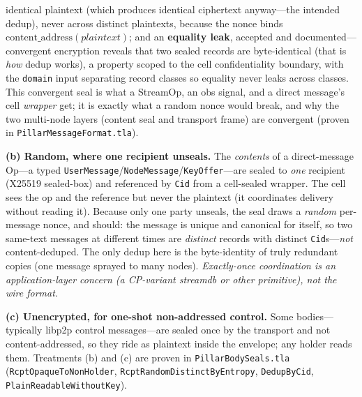 \documentclass[10pt,twocolumn]{article}
\newcommand{\code}[1]{\texttt{\small #1}}
\newcommand{\Cid}{\code{Cid}}
\begin{document}
identical plaintext (which produces identical ciphertext anyway---the intended
dedup), never across distinct plaintexts, because the nonce binds
$\mathrm{content\_address}(\mathit{plaintext})$; and an \textbf{equality leak},
accepted and documented---convergent encryption reveals that two sealed records are
byte-identical (that is \emph{how} dedup works), a property scoped to the cell
confidentiality boundary, with the \code{domain} input separating record classes
so equality never leaks across classes. This convergent seal is what a StreamOp, an
obs signal, and a direct message's cell \emph{wrapper} get; it is exactly what a
random nonce would break, and why the two multi-node layers (content seal and
transport frame) are convergent (proven in \code{PillarMessageFormat.tla}).

\textbf{(b) Random, where one recipient unseals.} The \emph{contents} of a
direct-message Op---a typed \code{UserMessage}/\code{NodeMessage}/\code{KeyOffer}---are
sealed to \emph{one} recipient (X25519 sealed-box) and referenced by \Cid{} from a
cell-sealed wrapper. The cell sees the op and the reference but never the plaintext
(it coordinates delivery without reading it). Because only one party unseals, the
seal draws a \emph{random} per-message nonce, and should: the message is unique and
canonical for itself, so two same-text messages at different times are \emph{distinct}
records with distinct \Cid{}s---\emph{not} content-deduped. The only dedup here is the
byte-identity of truly redundant copies (one message sprayed to many nodes).
\emph{Exactly-once coordination is an application-layer concern (a CP-variant streamdb
or other primitive), not the wire format.}

\textbf{(c) Unencrypted, for one-shot non-addressed control.} Some bodies---typically
libp2p control messages---are sealed once by the transport and not content-addressed,
so they ride as plaintext inside the envelope; any holder reads them. Treatments (b)
and (c) are proven in \code{PillarBodySeals.tla} (\code{RcptOpaqueToNonHolder},
\code{RcptRandomDistinctByEntropy}, \code{DedupByCid}, \code{PlainReadableWithoutKey}).
\end{document}
